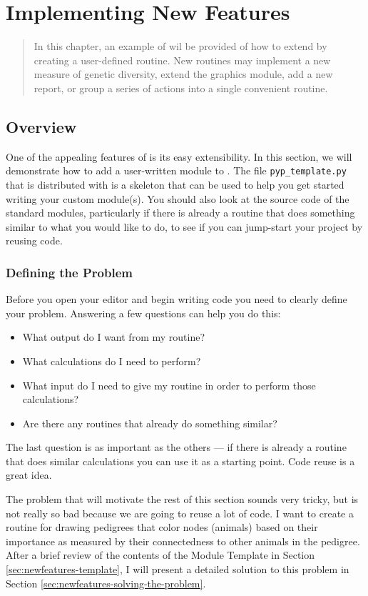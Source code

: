 \chapter{Implementing New Features}
\label{cha:newfeatures}
\begin{quote}
In this chapter, an example of wil be provided of how to extend \PyPedal{} by creating a user-defined routine.  New routines may implement a new measure of genetic diversity, extend the graphics module, add a new report, or group a series of actions into a single convenient routine.
\end{quote}
\section{Overview}
\label{sec:newfeatures-overview}
One of the appealing features of \PyPedal{} is its easy extensibility.  In this section, we will demonstrate how to add a
user-written module to \PyPedal{}.  The file \texttt{pyp\_template.py} that is distributed with \PyPedal{} is a
skeleton that can be used to help you get started writing your custom module(s).  You should also look at the source
code of the standard modules, particularly if there is already a routine that does something similar to what you would
like to do, to see if you can jump-start your project by reusing code.
\subsection{Defining the Problem}
\label{sec:newfeatures-overview-problem}
Before you open your editor and begin writing code you need to clearly define your problem.  Answering a few questions can
help you do this:
\begin{itemize}
\item What output do I want from my routine?
\item What calculations do I need to perform?
\item What input do I need to give my routine in order to perform those calculations?
\item Are there any \PyPedal{} routines that already do something similar?
\end{itemize}
The last question is as important as the others --- if there is already a \PyPedal{} routine that does similar calculations
you can use it as a starting point.  Code reuse is a great idea.

The problem that will motivate the rest of this section sounds very tricky, but is not really so bad because we are going to
reuse a lot of code.  I want to create a routine for drawing pedigrees that color nodes (animals) based on their importance as
measured by their connectedness to other animals in the pedigree.  After a brief review of the contents of the Module Template
in Section \ref{sec:newfeatures-template}, I will present a detailed solution to this problem in Section
\ref{sec:newfeatures-solving-the-problem}.
